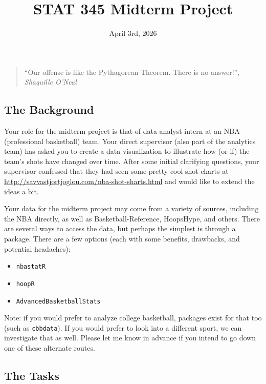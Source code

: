 \documentclass[
]{article}
\title{STAT 345 Midterm Project}
\author{}
\date{\vspace{-2.5em}April 3rd, 2026}
\providecommand{\tightlist}{%
  \setlength{\itemsep}{0pt}\setlength{\parskip}{0pt}}
\begin{document}
\maketitle

\begin{quote}
``Our offense is like the Pythagorean Theorem. There is no answer!'',
\emph{Shaquille O'Neal}
\end{quote}

\subsection{The Background}\label{the-background}

Your role for the midterm project is that of data analyst intern at an
NBA (professional basketball) team. Your direct supervisor (also part of
the analytics team) has asked you to create a data visualization to
illustrate how (or if) the team's shots have changed over time. After
some initial clarifying questions, your supervisor confessed that they
had seen some pretty cool shot charts at
\url{http://savvastjortjoglou.com/nba-shot-sharts.html} and would like
to extend the ideas a bit.

Your data for the midterm project may come from a variety of sources,
including the NBA directly, as well as Basketball-Reference, HoopsHype,
and others. There are several ways to access the data, but perhaps the
simplest is through a package. There are a few options (each with some
benefits, drawbacks, and potential headaches):

\begin{itemize}
\tightlist
\item
  \texttt{nbastatR}
\item
  \texttt{hoopR}
\item
  \texttt{AdvancedBasketballStats}
\end{itemize}

Note: if you would prefer to analyze college basketball, packages exist
for that too (such as \texttt{cbbdata}). If you would prefer to look
into a different sport, we can investigate that as well. Please let me
know in advance if you intend to go down one of these alternate routes.

\subsection{The Tasks}\label{the-tasks}
\end{document}
